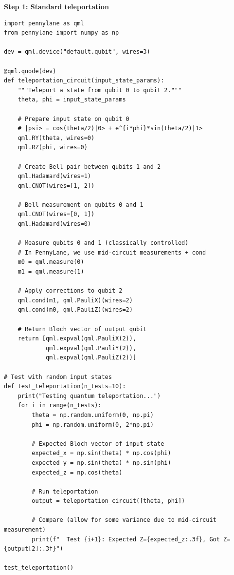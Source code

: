 \documentclass[11pt,a4paper]{article}
\begin{document}
\textbf{Step 1: Standard teleportation}
\begin{lstlisting}
import pennylane as qml
from pennylane import numpy as np

dev = qml.device("default.qubit", wires=3)

@qml.qnode(dev)
def teleportation_circuit(input_state_params):
    """Teleport a state from qubit 0 to qubit 2."""
    theta, phi = input_state_params
    
    # Prepare input state on qubit 0
    # |psi> = cos(theta/2)|0> + e^{i*phi}*sin(theta/2)|1>
    qml.RY(theta, wires=0)
    qml.RZ(phi, wires=0)
    
    # Create Bell pair between qubits 1 and 2
    qml.Hadamard(wires=1)
    qml.CNOT(wires=[1, 2])
    
    # Bell measurement on qubits 0 and 1
    qml.CNOT(wires=[0, 1])
    qml.Hadamard(wires=0)
    
    # Measure qubits 0 and 1 (classically controlled)
    # In PennyLane, we use mid-circuit measurements + cond
    m0 = qml.measure(0)
    m1 = qml.measure(1)
    
    # Apply corrections to qubit 2
    qml.cond(m1, qml.PauliX)(wires=2)
    qml.cond(m0, qml.PauliZ)(wires=2)
    
    # Return Bloch vector of output qubit
    return [qml.expval(qml.PauliX(2)),
            qml.expval(qml.PauliY(2)),
            qml.expval(qml.PauliZ(2))]

# Test with random input states
def test_teleportation(n_tests=10):
    print("Testing quantum teleportation...")
    for i in range(n_tests):
        theta = np.random.uniform(0, np.pi)
        phi = np.random.uniform(0, 2*np.pi)
        
        # Expected Bloch vector of input state
        expected_x = np.sin(theta) * np.cos(phi)
        expected_y = np.sin(theta) * np.sin(phi)
        expected_z = np.cos(theta)
        
        # Run teleportation
        output = teleportation_circuit([theta, phi])
        
        # Compare (allow for some variance due to mid-circuit measurement)
        print(f"  Test {i+1}: Expected Z={expected_z:.3f}, Got Z={output[2]:.3f}")

test_teleportation()
\end{lstlisting}
\end{document}
